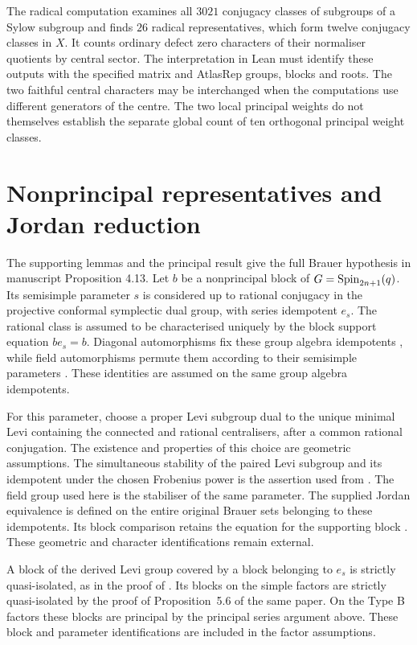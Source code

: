 The radical computation examines all $3021$ conjugacy classes of
subgroups of a Sylow subgroup and finds $26$ radical representatives,
which form twelve conjugacy classes in $X$. It counts ordinary defect zero
characters of their normaliser quotients by central sector. The
interpretation in Lean must identify these outputs with the specified
matrix and AtlasRep groups, blocks and roots. The two faithful central characters may be interchanged when the
computations use different generators of the centre. The two local principal
weights do not themselves establish the separate global count of ten
orthogonal principal weight classes.

\section{Nonprincipal representatives and Jordan reduction}

The supporting lemmas and the principal result give the full Brauer
hypothesis in manuscript Proposition 4.13. Let $b$ be a nonprincipal
block of $G=\operatorname{Spin}_{2n+1}(q)$. Its semisimple parameter $s$ is
considered up to rational conjugacy in the projective conformal symplectic
dual group, with series idempotent $e_s$. The rational class is assumed
to be characterised uniquely by the block support equation
$b e_s=b$. Diagonal automorphisms fix these group algebra idempotents
\cite[Lemma~7.4]{BonnafeDatRouquier2017}, while field automorphisms
permute them according to their semisimple parameters
\cite[Proposition~7.2]{Taylor2018Automorphisms}. These identities are
assumed on the same group algebra idempotents.

For this parameter, choose a proper Levi subgroup dual to the unique
minimal Levi containing the connected and rational centralisers, after
a common rational conjugation. The existence and properties of this
choice are geometric assumptions. The simultaneous stability of the
paired Levi subgroup and its idempotent under the chosen Frobenius power
is the assertion used from \cite[Lemma~4.5(a)--(b)]{Ruhstorfer2022Derived}.
The field group used here is the stabiliser of the same parameter. The supplied
Jordan equivalence is defined on the entire original Brauer sets
belonging to these idempotents. Its block comparison retains the
equation for the supporting block
\cite[Lemma~5.1 and the proof of Proposition~5.2]{FengLiZhang2022Jordan}.
These geometric and character identifications remain external.

A block of the derived Levi group covered by a block belonging to $e_s$
is strictly quasi-isolated, as in the proof of
\cite[Theorem~5.7]{FengLiZhang2022Jordan}. Its blocks on the simple factors
are strictly quasi-isolated by the proof of Proposition~5.6 of the same
paper. On the Type B factors these blocks are principal by the principal
series argument above. These block and parameter identifications are
included in the factor assumptions.

